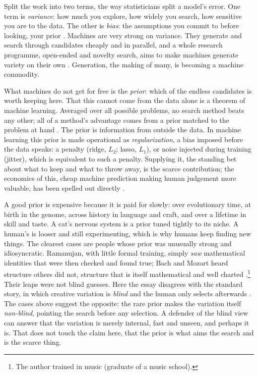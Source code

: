 \documentclass[11pt]{article}
\begin{document}
Split the work into two terms, the way statisticians split a model's error. One term is
\emph{variance}: how much you explore, how widely you search, how sensitive you are to the data. The
other is \emph{bias}: the assumptions you commit to before looking, your prior
\cite{geman1992}. Machines are very strong on variance. They generate and search through candidates
cheaply and in parallel, and a whole research programme, open-ended and novelty search, aims to make machines generate
variety on their own \cite{stanley2015}. Generation, the making of many, is becoming a machine commodity.

What machines do not get for free is the \emph{prior}: which of the endless candidates is worth
keeping here. That this cannot come from the data alone is a theorem of machine learning. Averaged over all possible
problems, no search method beats any other; all of a method's advantage comes from a prior matched to
the problem at hand \cite{wolpert1996}. The prior is information from outside the data. In machine learning this prior is made operational as
\emph{regularization}, a bias imposed before the data speaks: a penalty (ridge, \(L_2\); lasso,
\(L_1\)), or noise injected during training (jitter), which is equivalent to such a penalty. Supplying it,
the standing bet about what to keep and what to throw away, is the scarce contribution; the economics
of this, cheap machine prediction making human judgement more valuable, has been spelled out
directly \cite{agrawal2018}.

A good prior is expensive because it is paid for slowly: over evolutionary
time, at birth in the genome, across history in language and craft, and over a lifetime in skill and
taste. A cat's nervous system is a prior tuned tightly to its niche. A human's is looser and still
experimenting, which is why humans keep finding new things. The clearest cases are people whose
prior was unusually strong and idiosyncratic. Ramanujan, with little formal training, simply
\emph{saw} mathematical identities that were then checked and found true; Bach and Mozart heard
structure others did not, structure that is itself mathematical and well charted
\cite{voloshinov}.\footnote{The author trained in music (graduate of a music school).} Their leaps
were not blind guesses. Here the essay disagrees with the standard story, in which creative variation
is \emph{blind} and the human only selects afterwards \cite{campbell1960}. The cases above suggest
the opposite: the rare prior makes the variation itself \emph{non-blind}, pointing the search before
any selection. A defender of the blind view can answer that the variation is merely internal, fast
and unseen, and perhaps it is. That does not touch the claim here, that the prior is what aims the
search and is the scarce thing.
\end{document}
